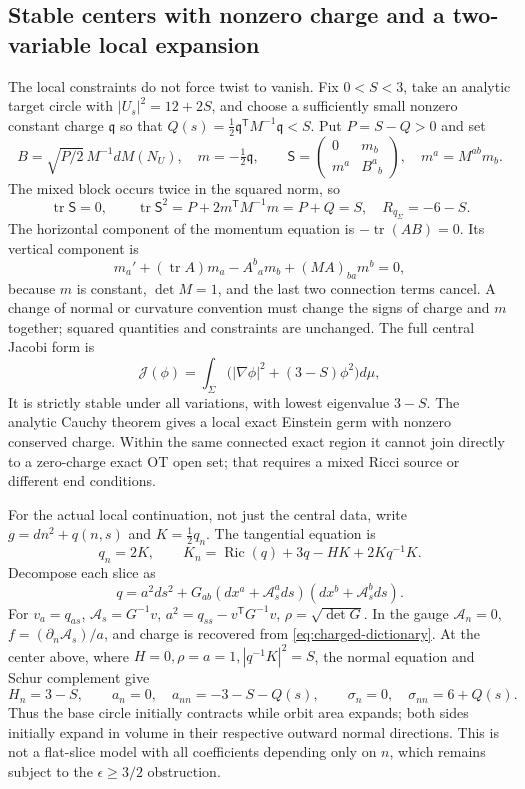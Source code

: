 \documentclass[a4paper,11pt]{article}
\numberwithin{equation}{section}
\theoremstyle{definition}
\newcommand{\Ric}{\operatorname{Ric}}
\newcommand{\tr}{\operatorname{tr}}
\begin{document}
\subsection{Stable centers with nonzero charge and a two-variable local expansion}
The local constraints do not force twist to vanish.
Fix $0<S<3$, take an analytic target circle with $|U_s|^2=12+2S$, and choose a sufficiently small nonzero constant charge $\mathfrak q$ so that
$Q(s)=\frac12\mathfrak q^{\mathsf T}M^{-1}\mathfrak q<S$.
Put $P=S-Q>0$ and set
\[
 B=\sqrt{P/2}\,M^{-1}dM(N_U),\quad m=-\tfrac12\mathfrak q,
 \qquad
 \mathsf S=\begin{pmatrix}0&m_b\\m^a&B^a{}_b\end{pmatrix},
 \quad m^a=M^{ab}m_b.
\]
The mixed block occurs twice in the squared norm, so
\[
 \tr\mathsf S=0,\qquad\tr\mathsf S^2=P+2m^{\mathsf T}M^{-1}m=P+Q=S,
 \quad R_{q_\Sigma}=-6-S.
\]
The horizontal component of the momentum equation is $-\tr(AB)=0$.
Its vertical component is
\[
 m_a'+(\tr A)m_a-A^b{}_am_b+(MA)_{ba}m^b=0,
\]
because $m$ is constant, $\det M=1$, and the last two connection terms cancel.
A change of normal or curvature convention must change the signs of charge and $m$ together; squared quantities and constraints are unchanged.
The full central Jacobi form is
\[
 \mathcal J(\phi)=\int_\Sigma
       \bigl(|\nabla\phi|^2+(3-S)\phi^2\bigr)d\mu,
\]
It is strictly stable under all variations, with lowest eigenvalue $3-S$.
The analytic Cauchy theorem gives a local exact Einstein germ with nonzero conserved charge.
Within the same connected exact region it cannot join directly to a zero-charge exact OT open set; that requires a mixed Ricci source or different end conditions.

For the actual local continuation, not just the central data, write
$g=dn^2+q(n,s)$ and $K=\frac12q_n$.
The tangential equation is
\[
 q_n=2K,\qquad K_n=\Ric(q)+3q-HK+2Kq^{-1}K.
\]
Decompose each slice as
\[
 q=a^2ds^2+G_{ab}(dx^a+\mathcal A_s^a ds)(dx^b+\mathcal A_s^b ds).
\]
For $v_a=q_{as}$,
$\mathcal A_s=G^{-1}v$, $a^2=q_{ss}-v^{\mathsf T}G^{-1}v$,
$\rho=\sqrt{\det G}$.
In the gauge $\mathcal A_n=0$, $f=(\partial_n\mathcal A_s)/a$, and charge is recovered from \eqref{eq:charged-dictionary}.
At the center above, where $H=0,\rho=a=1,|q^{-1}K|^2=S$, the normal equation and Schur complement give
\begin{equation}\label{eq:charged-taylor}
 H_n=3-S,\qquad a_n=0,\quad a_{nn}=-3-S-Q(s),
 \qquad\sigma_n=0,\quad\sigma_{nn}=6+Q(s).
\end{equation}
Thus the base circle initially contracts while orbit area expands; both sides initially expand in volume in their respective outward normal directions.
This is not a flat-slice model with all coefficients depending only on $n$, which remains subject to the $\epsilon\ge3/2$ obstruction.
\end{document}
